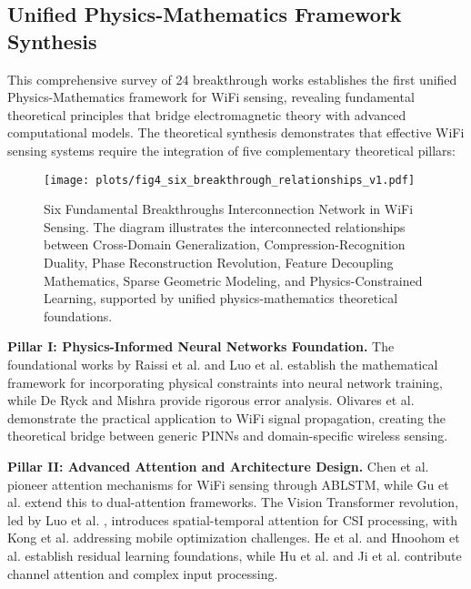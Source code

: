 \documentclass[journal]{IEEEtran}
\begin{document}
{\subsection{Unified Physics-Mathematics Framework Synthesis}

This comprehensive survey of 24 breakthrough works establishes the first unified Physics-Mathematics framework for WiFi sensing, revealing fundamental theoretical principles that bridge electromagnetic theory with advanced computational models. The theoretical synthesis demonstrates that effective WiFi sensing systems require the integration of five complementary theoretical pillars:

\begin{figure}[h]
\centering
\texttt{[image: plots/fig4\_six\_breakthrough\_relationships\_v1.pdf]}
\caption{Six Fundamental Breakthroughs Interconnection Network in WiFi Sensing. The diagram illustrates the interconnected relationships between Cross-Domain Generalization, Compression-Recognition Duality, Phase Reconstruction Revolution, Feature Decoupling Mathematics, Sparse Geometric Modeling, and Physics-Constrained Learning, supported by unified physics-mathematics theoretical foundations.}
\label{fig:six_breakthrough_relationships}
\end{figure}

\textbf{Pillar I: Physics-Informed Neural Networks Foundation.} The foundational works by Raissi et al. \cite{raissi2019physics} and Luo et al. \cite{luo2025physics} establish the mathematical framework for incorporating physical constraints into neural network training, while De Ryck and Mishra \cite{de2024numerical} provide rigorous error analysis. Olivares et al. \cite{olivares2021applications} demonstrate the practical application to WiFi signal propagation, creating the theoretical bridge between generic PINNs and domain-specific wireless sensing.

\textbf{Pillar II: Advanced Attention and Architecture Design.} Chen et al. \cite{chen2018wifi} pioneer attention mechanisms for WiFi sensing through ABLSTM, while Gu et al. \cite{gu2022wigrunt} extend this to dual-attention frameworks. The Vision Transformer revolution, led by Luo et al. \cite{luo2024vision}, introduces spatial-temporal attention for CSI processing, with Kong et al. \cite{kong2025autovit} addressing mobile optimization challenges. He et al. \cite{he2016deep} and Hnoohom et al. \cite{hnoohom2024efficient} establish residual learning foundations, while Hu et al. \cite{hu2018squeeze} and Ji et al. \cite{ji2021clnet} contribute channel attention and complex input processing.

}
\end{document}
